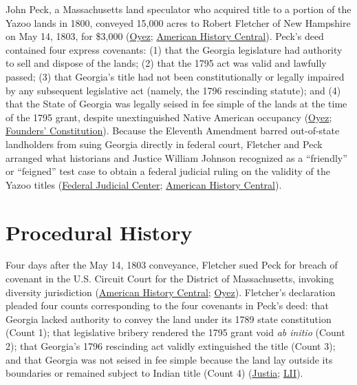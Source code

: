 \documentclass[12pt]{article}
\begin{document}
John Peck, a Massachusetts land speculator who acquired title to a portion of the Yazoo lands in 1800, conveyed 15,000 acres to Robert Fletcher of New Hampshire on May 14, 1803, for \$3,000 (\href{https://www.oyez.org/cases/1789-1850/10us87}{Oyez}; \href{https://www.americanhistorycentral.com/entries/fletcher-v-peck-1810/}{American History Central}). Peck's deed contained four express covenants: (1) that the Georgia legislature had authority to sell and dispose of the lands; (2) that the 1795 act was valid and lawfully passed; (3) that Georgia's title had not been constitutionally or legally impaired by any subsequent legislative act (namely, the 1796 rescinding statute); and (4) that the State of Georgia was legally seised in fee simple of the lands at the time of the 1795 grant, despite unextinguished Native American occupancy (\href{https://www.oyez.org/cases/1789-1850/10us87}{Oyez}; \href{https://press-pubs.uchicago.edu/founders/documents/a1_10_1s12.html}{Founders' Constitution}). Because the Eleventh Amendment barred out-of-state landholders from suing Georgia directly in federal court, Fletcher and Peck arranged what historians and Justice William Johnson recognized as a ``friendly'' or ``feigned'' test case to obtain a federal judicial ruling on the validity of the Yazoo titles (\href{https://www.fjc.gov/history/cases/cases-that-shaped-the-federal-courts/fletcher-v-peck}{Federal Judicial Center}; \href{https://www.americanhistorycentral.com/entries/fletcher-v-peck-1810/}{American History Central}).

\section{Procedural History}

Four days after the May 14, 1803 conveyance, Fletcher sued Peck for breach of covenant in the U.S. Circuit Court for the District of Massachusetts, invoking diversity jurisdiction (\href{https://www.americanhistorycentral.com/entries/fletcher-v-peck-1810/}{American History Central}; \href{https://www.oyez.org/cases/1789-1850/10us87}{Oyez}). Fletcher's declaration pleaded four counts corresponding to the four covenants in Peck's deed: that Georgia lacked authority to convey the land under its 1789 state constitution (Count 1); that legislative bribery rendered the 1795 grant void \textit{ab initio} (Count 2); that Georgia's 1796 rescinding act validly extinguished the title (Count 3); and that Georgia was not seised in fee simple because the land lay outside its boundaries or remained subject to Indian title (Count 4) (\href{https://supreme.justia.com/cases/federal/us/10/87/}{Justia}; \href{https://www.law.cornell.edu/supremecourt/text/10/87}{LII}).
\end{document}

